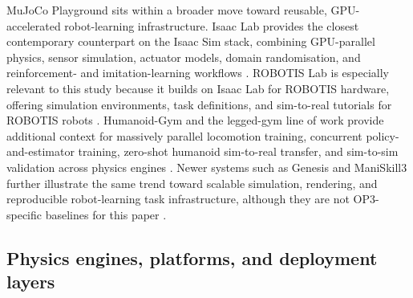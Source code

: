 MuJoCo Playground sits within a broader move toward reusable, GPU-accelerated robot-learning infrastructure. Isaac Lab provides the closest contemporary counterpart on the Isaac Sim stack, combining GPU-parallel physics, sensor simulation, actuator models, domain randomisation, and reinforcement- and imitation-learning workflows \citep{Mittal2025-isaac-lab-gpu-accelerated-simulation-framework-multi-modal-robot-learning}. ROBOTIS Lab is especially relevant to this study because it builds on Isaac Lab for ROBOTIS hardware, offering simulation environments, task definitions, and sim-to-real tutorials for ROBOTIS robots \citep{ROBOTIS2026-robotis-lab-reinforcement-learning-imitation-learning-robotis-robots}. Humanoid-Gym and the legged-gym line of work provide additional context for massively parallel locomotion training, concurrent policy-and-estimator training, zero-shot humanoid sim-to-real transfer, and sim-to-sim validation across physics engines \citep{Rudin2022-learning-to-walk-in-minutes-massively-parallel-deep-reinforcement-learning,Ji2022-concurrent-training-control-policy-state-estimator-dynamic-robust-legged-locomotion,Gu2024-humanoid-gym-reinforcement-learning-humanoid-robot-zero-shot-sim-to-real-transfer}. Newer systems such as Genesis and ManiSkill3 further illustrate the same trend toward scalable simulation, rendering, and reproducible robot-learning task infrastructure, although they are not OP3-specific baselines for this paper \citep{GenesisAuthors2024-genesis-generative-universal-physics-engine-robotics-beyond,Tao2025-maniskill3-gpu-parallelized-robot-simulation-rendering-generalizable-embodied-ai}.

\subsection{Physics engines, platforms, and deployment layers}

